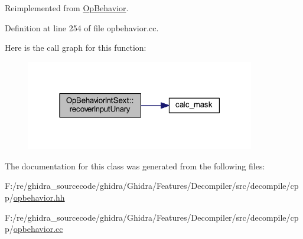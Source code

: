 Reimplemented from \mbox{\hyperlink{class_op_behavior_a6c3b008e093085e50f71020437be3b03}{Op\+Behavior}}.



Definition at line 254 of file opbehavior.\+cc.

Here is the call graph for this function\+:
\nopagebreak
\begin{figure}[H]
\begin{center}
\leavevmode
\includegraphics[width=283pt]{class_op_behavior_int_sext_ab4576951030123a125defa0b27d19f01_cgraph}
\end{center}
\end{figure}


The documentation for this class was generated from the following files\+:\begin{DoxyCompactItemize}
\item 
F\+:/re/ghidra\+\_\+sourcecode/ghidra/\+Ghidra/\+Features/\+Decompiler/src/decompile/cpp/\mbox{\hyperlink{opbehavior_8hh}{opbehavior.\+hh}}\item 
F\+:/re/ghidra\+\_\+sourcecode/ghidra/\+Ghidra/\+Features/\+Decompiler/src/decompile/cpp/\mbox{\hyperlink{opbehavior_8cc}{opbehavior.\+cc}}\end{DoxyCompactItemize}
